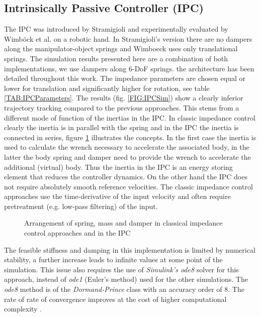 \documentclass[a4paper,twoside, openright,12pt]{report}
\begin{document}
\subsection{Intrinsically Passive Controller (IPC)}
The IPC was introduced by Stramigioli \cite{Stramigioli_01} and experimentally evaluated by Wimb\"ock et al. \cite{Wimboeck_08} on a robotic hand. In Stramigioli's version there are no dampers along the manipulator-object springs and Wimboeck uses only translational springs. The simulation results presented here are a combination of both implementations, we use dampers along 6-DoF springs. the architecture has been detailed throughout this work. The impedance parameters are chosen equal or lower for translation and significantly higher for rotation, see table \ref{TAB:IPCParameters}. The results (fig. \ref{FIG:IPCSim}) show a clearly inferior trajectory tracking compared to the previous approaches. This stems from a different mode of function of the inertias in the IPC. In classic impedance control clearly the inertia is in parallel with the spring and in the IPC the inertia is connected in series, figure \ref{FIG:ImpedanceIPC} illustrates the concepts. In the first case the inertia is used to calculate the wrench necessary to accelerate the associated body, in the latter the body spring and damper need to provide the wrench to accelerate the additional (virtual) body. Thus the inertia in the IPC is an energy storing element that reduces the controller dynamics. On the other hand the IPC does not require absolutely smooth reference velocities. The classic impedance control approaches use the time-derivative of the input velocity and often require pretreatment (e.g. low-pass filtering) of the input.\\
\begin{figure}[H]
	\centering
	\small
	\def\svgwidth{0.95\columnwidth}
	
	\caption{Arrangement of spring, mass and damper in classical impedance control approaches and in the IPC }
	\label{FIG:ImpedanceIPC}
\end{figure}
The feasible stiffness and damping in this implementation is limited by numerical stability, a further increase leads to infinite values at some point of the simulation. This issue also requires the use of \emph{Simulink's ode8} solver for this approach, instead of \emph{ode1} (Euler's method) used for the other simulations. The \emph{ode8} method is of the \emph{Dormand-Prince} class with an accuracy order of $8$. The rate of rate of convergence improves at the cost of higher computational complexity \cite{SimulinkHelp:Solver}. 
\end{document}
